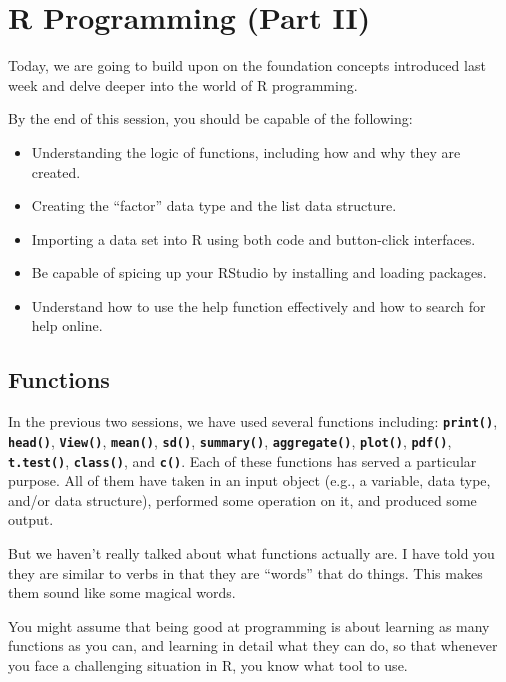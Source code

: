 \documentclass[
]{book}
\providecommand{\tightlist}{%
  \setlength{\itemsep}{0pt}\setlength{\parskip}{0pt}}
\begin{document}
\hypertarget{programming2}{%
\chapter{\texorpdfstring{\textbf{R Programming (Part II)}}{R Programming (Part II)}}\label{programming2}}

Today, we are going to build upon on the foundation concepts introduced last week and delve deeper into the world of R programming.

By the end of this session, you should be capable of the following:

\begin{itemize}
\tightlist
\item
  Understanding the logic of functions, including how and why they are created.
\item
  Creating the ``factor'' data type and the list data structure.
\item
  Importing a data set into R using both code and button-click interfaces.
\item
  Be capable of spicing up your RStudio by installing and loading packages.\\
\item
  Understand how to use the help function effectively and how to search for help online.
\end{itemize}

\hypertarget{functions}{%
\section{Functions}\label{functions}}

In the previous two sessions, we have used several functions including: \textbf{\texttt{print()}}, \textbf{\texttt{head()}}, \textbf{\texttt{View()}}, \textbf{\texttt{mean()}}, \textbf{\texttt{sd()}}, \textbf{\texttt{summary()}}, \textbf{\texttt{aggregate()}}, \textbf{\texttt{plot()}}, \textbf{\texttt{pdf()}}, \textbf{\texttt{t.test()}}, \textbf{\texttt{class()}}, and \textbf{\texttt{c()}}. Each of these functions has served a particular purpose. All of them have taken in an input object (e.g., a variable, data type, and/or data structure), performed some operation on it, and produced some output.

But we haven't really talked about what functions actually are. I have told you they are similar to verbs in that they are ``words'' that do things. This makes them sound like some magical words.

You might assume that being good at programming is about learning as many functions as you can, and learning in detail what they can do, so that whenever you face a challenging situation in R, you know what tool to use.
\end{document}
